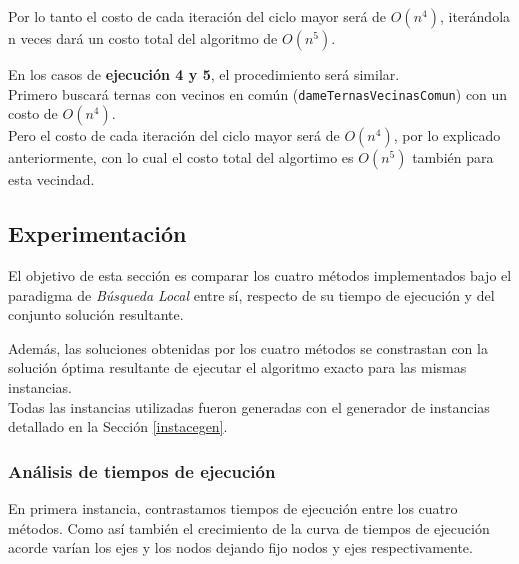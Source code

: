 Por lo tanto el costo de cada iteraci\'on del ciclo mayor ser\'a de $O(n^4)$, iter\'andola n veces dar\'a un costo total del algoritmo de $O(n^5)$.\\

\bigskip	

En los casos de \textbf{ejecuci\'on 4 y 5}, el procedimiento ser\'a similar.\\

Primero buscar\'a ternas con vecinos en com\'un (\texttt{dameTernasVecinasComun}) con un costo de $O(n^4)$.\\

Pero el costo de cada iteraci\'on del ciclo mayor ser\'a de $O(n^4)$, por lo explicado anteriormente, con lo cual el costo total del algortimo es $O(n^5)$ tambi\'en para esta vecindad. 


\newpage
\subsection{Experimentaci\'on}

El objetivo de esta secci\'on es comparar los cuatro m\'etodos implementados bajo el paradigma de \emph{B\'usqueda Local} entre s\'i, respecto de su tiempo de ejecuci\'on y del conjunto soluci\'on resultante.

Adem\'as, las soluciones obtenidas por los cuatro m\'etodos se constrastan con la soluci\'on \'optima resultante de ejecutar el algoritmo exacto para las mismas instancias.\\

Todas las instancias utilizadas fueron generadas con el generador de instancias detallado en la Secci\'on \ref{instacegen}.

\subsubsection{An\'alisis de tiempos de ejecuci\'on}\label{tiempos}

En primera instancia, contrastamos tiempos de ejecuci\'on entre los cuatro m\'etodos. Como as\'i tambi\'en el crecimiento de la curva de tiempos de ejecuci\'on acorde var\'ian los ejes y los nodos dejando fijo nodos y ejes respectivamente.

